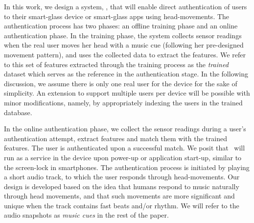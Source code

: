 In this work, we design a system, \systemname, that will enable direct authentication of users to their smart-glass device or smart-glass apps using
head-movements.  %
The authentication process has two phases: an offline training phase and an
online authentication phase. In the training phase, the system
collects sensor readings when the real user moves her head with a music cue (following her pre-designed movement pattern), and uses the collected data to
extract the features. We refer to this set of
features extracted through the training process as the {\em trained} dataset
which  serves as the reference in the authentication stage.
In the following discussion, we assume there is only
one real user for the device for the sake of simplicity. An extension to
support multiple users per device will be possible with minor modifications,
namely, by appropriately indexing the users in the trained database.

In the online authentication phase, we collect the sensor readings during a user's authentication attempt, extract features and match them with the trained features. 
The user is authenticated upon a successful match.
We posit that \systemname~will run as a service in the device upon power-up or application start-up,
similar to the screen-lock in smartphones.  The authentication process is initiated
by playing a short audio track, to which the user
responds through head-movements. Our design is developed based on the idea that humans respond to music
naturally through head movements, and that such movements are more
significant and unique when the track contains fast beats and/or rhythm.
We will refer to the audio snapshots as {\em music cues} in the rest of the
paper.

